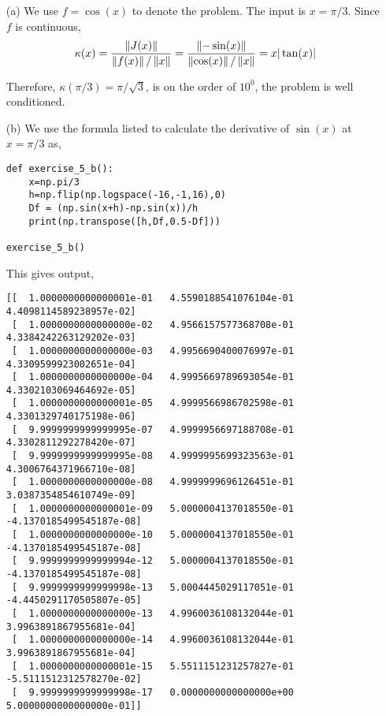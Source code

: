 \documentclass[10pt]{article}
\begin{document}
\begin{solution}[Solution]
\begin{enumerate}
    \item[(a)] 
       We use \( f=\cos(x) \) to denote the problem. The input is \( x=\pi /3 \). Since \( f \) is continuous,
        \begin{align*}
            \kappa(x) = \dfrac{\left\lVert J(x)\right\rVert}{\left\lVert f(x)\right\rVert/\left\lVert x\right\rVert} = \dfrac{\left\lVert-\sin(x)\right\rVert}{\left\lVert\cos(x)\right\rVert/\left\lVert x\right\rVert} = x|\tan(x)|
        \end{align*}

        Therefore, \( \kappa(\pi/3)= \pi/\sqrt{3} \), is on the order of \( 10^0 \), the problem is well conditioned.



    \item[(b)]
        We use the formula listed to calculate the derivative of \( \sin(x) \) at \( x=\pi/3 \) as,
        \begin{lstlisting}
def exercise_5_b():
    x=np.pi/3
    h=np.flip(np.logspace(-16,-1,16),0)
    Df = (np.sin(x+h)-np.sin(x))/h
    print(np.transpose([h,Df,0.5-Df]))

exercise_5_b()
        \end{lstlisting}

        This gives output,
        \begin{lstlisting}[basicstyle=\ttfamily\small]
[[  1.0000000000000001e-01   4.5590188541076104e-01    4.4098114589238957e-02]
 [  1.0000000000000000e-02   4.9566157577368708e-01    4.3384242263129202e-03]
 [  1.0000000000000000e-03   4.9956690400076997e-01    4.3309599923002651e-04]
 [  1.0000000000000000e-04   4.9995669789693054e-01    4.3302103069464692e-05]
 [  1.0000000000000001e-05   4.9999566986702598e-01    4.3301329740175198e-06]
 [  9.9999999999999995e-07   4.9999956697188708e-01    4.3302811292278420e-07]
 [  9.9999999999999995e-08   4.9999995699323563e-01    4.3006764371966710e-08]
 [  1.0000000000000000e-08   4.9999999696126451e-01    3.0387354854610749e-09]
 [  1.0000000000000001e-09   5.0000004137018550e-01   -4.1370185499545187e-08]
 [  1.0000000000000000e-10   5.0000004137018550e-01   -4.1370185499545187e-08]
 [  9.9999999999999994e-12   5.0000004137018550e-01   -4.1370185499545187e-08]
 [  9.9999999999999998e-13   5.0004445029117051e-01   -4.4450291170505807e-05]
 [  1.0000000000000000e-13   4.9960036108132044e-01    3.9963891867955681e-04]
 [  1.0000000000000000e-14   4.9960036108132044e-01    3.9963891867955681e-04]
 [  1.0000000000000001e-15   5.5511151231257827e-01   -5.5111512312578270e-02]
 [  9.9999999999999998e-17   0.0000000000000000e+00    5.0000000000000000e-01]]
        \end{lstlisting}


\end{enumerate}
\end{solution}
\end{document}
